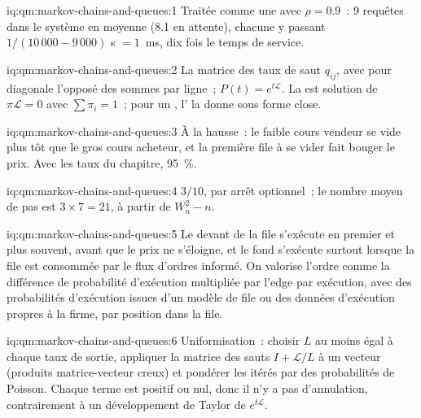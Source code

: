 \begin{solution}{iq:qm:markov-chains-and-queues:1}
Traitée comme une  avec $\rho = 0.9$~: 9 requêtes dans le système en moyenne (8.1 en attente), chacune y passant $1/(10\,000 - 9\,000)$
s $= 1$~ms, dix fois le temps de service.
\end{solution}

\begin{solution}{iq:qm:markov-chains-and-queues:2}
La matrice des taux de saut $q_{ij}$, avec pour diagonale l'opposé des sommes par ligne~; $P(t) = e^{t\mathcal L}$. La 
est solution de $\pi\mathcal L = 0$ avec $\sum\pi_i = 1$~; pour un , l' la donne sous forme close.
\end{solution}

\begin{solution}{iq:qm:markov-chains-and-queues:3}
À la hausse~: le faible cours vendeur se vide plus tôt que le gros cours acheteur, et la première file à se vider fait bouger le prix. Avec les
taux du chapitre, 95~\%.
\end{solution}

\begin{solution}{iq:qm:markov-chains-and-queues:4}
$3/10$, par arrêt optionnel~; le nombre moyen de pas est $3 \times 7 = 21$, à partir de $W_n^2 - n$.
\end{solution}

\begin{solution}{iq:qm:markov-chains-and-queues:5}
Le devant de la file s'exécute en premier et plus souvent, avant que le prix ne s'éloigne, et le fond s'exécute surtout lorsque la file est
consommée par le flux d'ordres informé. On valorise l'ordre comme la différence de probabilité d'exécution multipliée par l'edge par exécution, avec des
probabilités d'exécution issues d'un modèle de file ou des données d'exécution propres à la firme, par position dans la file.
\end{solution}

\begin{solution}{iq:qm:markov-chains-and-queues:6}
Uniformisation~: choisir $L$ au moins égal à chaque taux de sortie, appliquer la matrice des sauts $I + \mathcal L/L$ à un vecteur (produits
matrice-vecteur creux) et pondérer les itérés par des probabilités de Poisson. Chaque terme est positif ou nul, donc il n'y a
pas d'annulation, contrairement à un développement de Taylor de $e^{t\mathcal L}$.
\end{solution}
